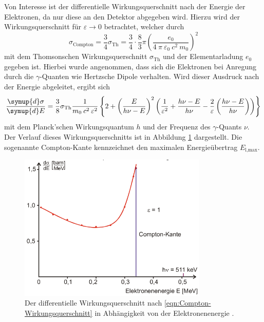 Von Interesse ist der differentielle Wirkungsquerschnitt nach der Energie der
Elektronen, da nur diese an den Detektor abgegeben wird. Hierzu
wird der Wirkungsquerschnitt für $\varepsilon \rightarrow 0$ betrachtet,
welcher durch
\begin{equation*}
	\sigma_\text{Compton} = \frac{3}{4} \sigma_\text{Th}
	= \frac{3}{4} \cdot \frac{8}{3} \pi
	\left(\frac{e_0}{4\:\pi\:\varepsilon_0\:c^2\:m_0}\right)^2
\end{equation*}
mit dem Thomsonschen Wirkungsquerschnitt $\sigma_\text{Th}$ und der Elementarladung $e_0$ gegeben ist.
Hierbei wurde angenommen, dass sich die Elektronen bei Anregung durch die
$\gamma$-Quanten wie Hertzsche Dipole verhalten.
Wird dieser Ausdruck nach der Energie abgeleitet, ergibt sich
\begin{equation}
	\frac{\symup{d}\sigma}{\symup{d}E} =
	\frac{3}{8} \sigma_\text{Th} \frac{1}{m_0\:c^2\:\varepsilon^2}
	\left\{2 + \left(\frac{E}{h \nu - E}\right)^2
	\left(\frac{1}{\varepsilon^2} + \frac{h \nu - E}{h \nu} - \frac{2}{\varepsilon}
	\left(\frac{h \nu - E}{h \nu}\right)\right)\right\}
	\label{eqn:Compton-Wirkungsquerschnitt}
\end{equation}
mit dem Planck'schen Wirkungsquantum $h$ und der Frequenz des $\gamma$-Quants $\nu$.
Der Verlauf dieses Wirkungsquerschnitts ist in Abbildung \ref{fig:Compton-Wirkungsquerschnitt}
dargestellt. Die sogenannte Compton-Kante kennzeichnet den maximalen Energieübertrag
$E_\text{l,max}$.

\begin{figure}
	\centering
	\includegraphics[height=7.0cm]{images/Compton-Wirkungsquerschnitt.pdf}
	\caption{Der differentielle Wirkungsquerschnitt nach \eqref{eqn:Compton-Wirkungsquerschnitt}
	in Abhängigkeit von der Elektronenenergie \cite[7]{anleitung}.}
	\label{fig:Compton-Wirkungsquerschnitt}
\end{figure}
\FloatBarrier

